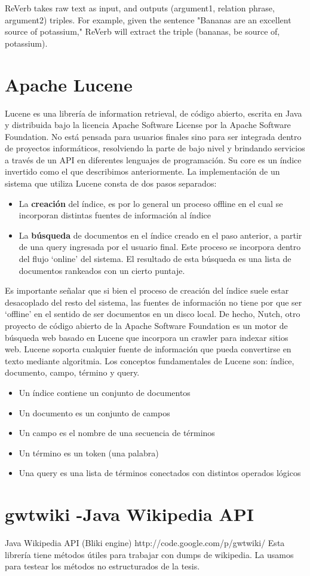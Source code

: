 ReVerb takes raw text as input, and outputs (argument1, relation phrase, argument2) triples. For example, given the sentence "Bananas are an excellent source of potassium," ReVerb will extract the triple (bananas, be source of, potassium).

\section{Apache Lucene}
Lucene es una librer\'ia de information retrieval, de c\'odigo abierto, escrita en Java y distribuida 
bajo la licencia Apache Software License por la Apache Software Foundation. No est\'a pensada para
usuarios finales sino para ser integrada dentro de proyectos inform\'aticos, resolviendo
la parte de bajo nivel y brindando servicios a trav\'es de un API en diferentes lenguajes de programaci\'on.
Su core es un \'indice invertido como el que describimos anteriormente. La implementaci\'on de un sistema
que utiliza Lucene consta de dos pasos separados:
\begin{itemize}
\item La \textbf{creaci\'on} del \'indice, es por lo general un proceso offline en el cual 
se incorporan distintas fuentes de informaci\'on al \'indice 
\item La \textbf{b\'usqueda} de documentos en el \'indice creado en el paso anterior, a partir de una query 
ingresada por el usuario final. Este proceso se incorpora dentro del flujo `online' del sistema.
El resultado de esta b\'usqueda es una lista de documentos rankeados con un cierto puntaje. 
\end{itemize}

Es importante señalar que si bien el proceso de creaci\'on del \'indice suele estar desacoplado del resto 
del sistema, las fuentes de informaci\'on no tiene por que ser `offline' en el sentido de ser documentos
en un disco local. De hecho, Nutch, otro proyecto de c\'odigo abierto de la Apache Software Foundation es 
un motor de b\'usqueda web basado en Lucene que incorpora un crawler para indexar sitios web. Lucene soporta 
cualquier fuente de informaci\'on que pueda convertirse en texto mediante algoritmia.
\newline
Los conceptos fundamentales de Lucene son: \'indice, documento, campo, t\'ermino y query.
\begin{itemize}
\item Un \'indice contiene un conjunto de documentos
\item Un documento es un conjunto de campos
\item Un campo es el nombre de una secuencia de t\'erminos
\item Un t\'ermino es un token (una palabra)
\item Una query es una lista de t\'erminos conectados con distintos operados l\'ogicos
\end{itemize}


\section{gwtwiki -Java Wikipedia API}

Java Wikipedia API (Bliki engine)
http://code.google.com/p/gwtwiki/
Esta librer\'ia tiene m\'etodos \'utiles para trabajar con dumps de wikipedia. La usamos para testear los m\'etodos no estructurados de la tesis.
